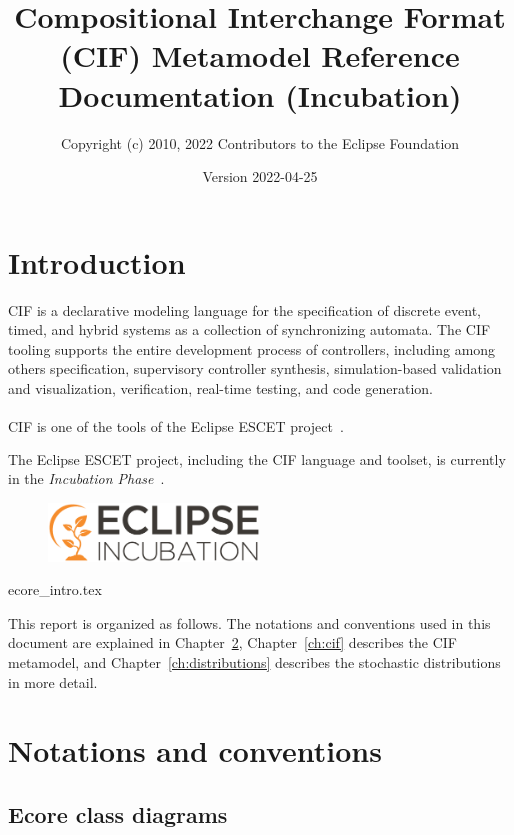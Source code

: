 \documentclass{report}
\title{Compositional Interchange Format (CIF) Metamodel Reference Documentation (Incubation)}
\author{Copyright (c) 2010, 2022 Contributors to the Eclipse Foundation}
\date{Version 2022-04-25}
\begin{document}
\maketitle
\tableofcontents

\chapter{Introduction}
CIF is a declarative modeling language for the specification of discrete
event, timed, and hybrid systems as a collection of synchronizing automata.
The CIF tooling supports the entire development process of controllers,
including among others specification, supervisory controller synthesis,
simulation-based validation and visualization, verification, real-time
testing, and code generation.

CIF is one of the tools of the Eclipse ESCET\textsuperscript{\texttrademark{}}
project~\cite{Eclipse:ESCET}.

The Eclipse ESCET project, including the CIF language and toolset, is
currently in the \emph{Incubation Phase}~\cite{Eclipse:Incubation}.
\begin{figure}[H]
  \centering
  \includegraphics[width=0.5\textwidth]{figures/eclipse-incubation.png}
\end{figure}


       {ecore_intro.tex}

This report is organized as follows. The notations and conventions used in
this document are explained in Chapter~\ref{ch:notations-conventions},
Chapter~\ref{ch:cif} describes the CIF metamodel, and
Chapter~\ref{ch:distributions} describes the stochastic distributions in more
detail.


\chapter{Notations and conventions}\label{ch:notations-conventions}

\section{Ecore class diagrams}
\end{document}

